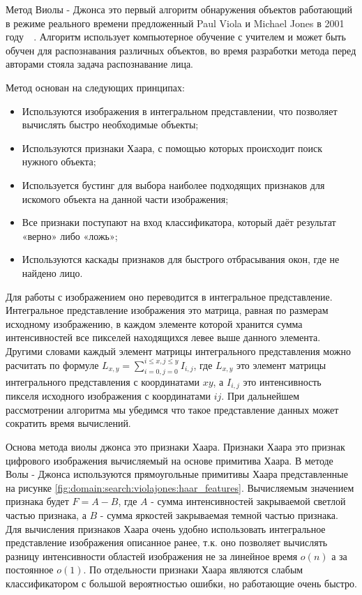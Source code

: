 Метод Виолы - Джонса  это первый алгоритм обнаружения объектов работающий в режиме реального времени предложенный Paul Viola и Michael Jones в 2001 году~\cite{viola_jones_wiki}~\cite{viola_jones_habr}. Алгоритм использует компьютерное обучение с учителем и может быть обучен для распознавания различных объектов, во время разработки метода перед авторами стояла задача распознавание лица. 

Метод основан на следующих принципах:
\begin{itemize}
  \item Используются изображения в интегральном представлении, что позволяет вычислять быстро необходимые объекты;
  \item Используются признаки Хаара, с помощью которых происходит поиск нужного объекта;
  \item Используется бустинг для выбора наиболее подходящих признаков для искомого объекта на данной части изображения;
  \item Все признаки поступают на вход классификатора, который даёт результат «верно» либо «ложь»;
  \item Используются каскады признаков для быстрого отбрасывания окон, где не найдено лицо.
\end{itemize}

Для работы с изображением оно переводится в интегральное представление. Интегральное представление изображения это матрица, равная по размерам исходному изображению, в каждом элементе которой хранится сумма интенсивностей все пикселей находящихся левее выше данного элемента. Другими словами каждый элемент матрицы интегрального представления можно расчитать по формуле 
$ L_{x,y} = \sum_{i=0,j=0}^{i \leq x, j \leq y} I_{i,j} $, где $L_{x,y}$ это элемент матрицы интегрального представления с координатами $xy$, а $I_{i,j}$ это интенсивность пикселя исходного изображения с координатами $ij$.
При дальнейшем рассмотрении алгоритма мы убедимся что такое представление данных может сократить время вычислений.

Основа метода виолы джонса это признаки Хаара. Признаки Хаара это признак цифрового изображения вычисляемый на основе примитива Хаара. В методе Волы - Джонса используются прямоугольные примитивы Хаара представленные на рисунке \ref{fig:domain:search:violajones:haar_features}. Вычисляемым значением признака будет $F = A - B$, где $A$ - сумма интенсивностей закрываемой светлой частью признака, а $B$ - сумма яркостей закрываемая темной частью признака. Для вычисления признаков Хаара очень удобно использовать интегральное представление изображения описанное ранее, т.к. оно позволяет вычислять разницу интенсивности областей изображения не за линейное время $o(n)$ а за постоянное $o(1)$. По отдельности признаки Хаара являются слабым классификатором с большой вероятностью ошибки, но работающие очень быстро. 

